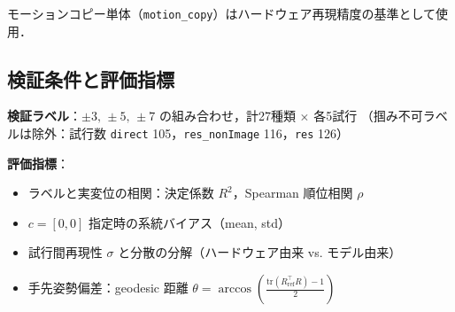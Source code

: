モーションコピー単体（\texttt{motion\_copy}）はハードウェア再現精度の基準として使用．

\subsection{検証条件と評価指標}

\textbf{検証ラベル}：$\pm3,\,\pm5,\,\pm7$ の組み合わせ，計27種類 $\times$ 各5試行
（掴み不可ラベルは除外：試行数 \texttt{direct} 105，\texttt{res\_nonImage} 116，\texttt{res} 126）

\textbf{評価指標}：
\begin{itemize}
  \item ラベルと実変位の相関：決定係数 $R^2$，Spearman 順位相関 $\rho$
  \item $c=[0,0]$ 指定時の系統バイアス（mean, std）
  \item 試行間再現性 $\sigma$ と分散の分解（ハードウェア由来 vs. モデル由来）
  \item 手先姿勢偏差：geodesic 距離 $\theta = \arccos\!\left(\frac{\mathrm{tr}(R_\mathrm{ref}^\top R)-1}{2}\right)$
\end{itemize}
